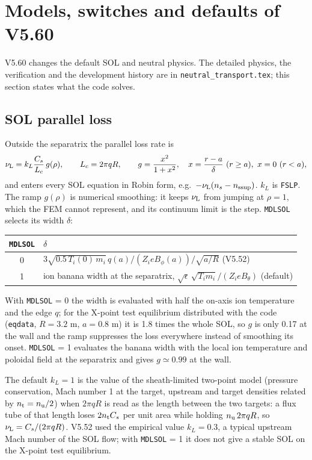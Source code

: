 \documentclass[11pt]{article}
\def\r#1{{\rm#1}}
\def\nsup#1{n_\r{#1sup}}
\def\nuL{\nu_\r{L}}
\begin{document}
\section{Models, switches and defaults of V5.60}
\setcounter{equation}{0}

V5.60 changes the default SOL and neutral physics.  The detailed physics,
the verification and the development history are in
\texttt{neutral\_transport.tex}; this section states what the code solves.

\subsection{SOL parallel loss}

Outside the separatrix the parallel loss rate is
\begin{equation}
  \nuL = k_L \frac{C_s}{L_c}\, g(\rho),\qquad L_c = 2\pi q R,\qquad
  g = \frac{x^2}{1+x^2},\quad x = \frac{r-a}{\delta}\ (r\ge a),\ x=0\ (r<a),
\end{equation}
and enters every SOL equation in Robin form, e.g.\ $-\nuL(n_s-\nsup{s})$.
$k_L$ is \texttt{FSLP}.  The ramp $g(\rho)$ is numerical smoothing: it keeps
$\nuL$ from jumping at $\rho=1$, which the FEM cannot represent, and its
continuum limit is the step.  \texttt{MDLSOL} selects its width $\delta$:

\begin{center}
\begin{tabular}{|c|l|}\hline
\texttt{MDLSOL} & $\delta$ \\\hline
0 & $3\sqrt{0.5\,T_i(0)\,m_i}\,q(a)/(Z_ieB_\phi(a))/\sqrt{a/R}$ (V5.52) \\
1 & ion banana width at the separatrix, $\sqrt{\epsilon}\,\sqrt{T_i m_i}/(Z_i e B_\theta)$ (default) \\\hline
\end{tabular}
\end{center}

With \texttt{MDLSOL} = 0 the width is evaluated with half the on-axis ion
temperature and the edge $q$; for the X-point test equilibrium distributed with
the code (\texttt{eqdata}, $R=3.2$ m, $a=0.8$ m) it is 1.8 times the whole SOL, so
$g$ is only 0.17 at the wall and the ramp suppresses the loss everywhere instead
of smoothing its onset.  \texttt{MDLSOL} = 1 evaluates the banana width with the
local ion temperature and poloidal field at the separatrix and gives
$g\simeq 0.99$ at the wall.

The default $k_L = 1$ is the value of the sheath-limited two-point model
(pressure conservation, Mach number 1 at the target, upstream and target
densities related by $n_\r{t}=n_\r{u}/2$) when $2\pi qR$ is read as the length
between the two targets: a flux tube of that length loses $2n_\r{t}C_s$ per unit
area while holding $n_\r{u}\,2\pi qR$, so $\nuL = C_s/(2\pi qR)$.  V5.52 used the
empirical value $k_L=0.3$, a typical upstream Mach number of the SOL flow; with
\texttt{MDLSOL} = 1 it does not give a stable SOL on the X-point test
equilibrium.
\end{document}
